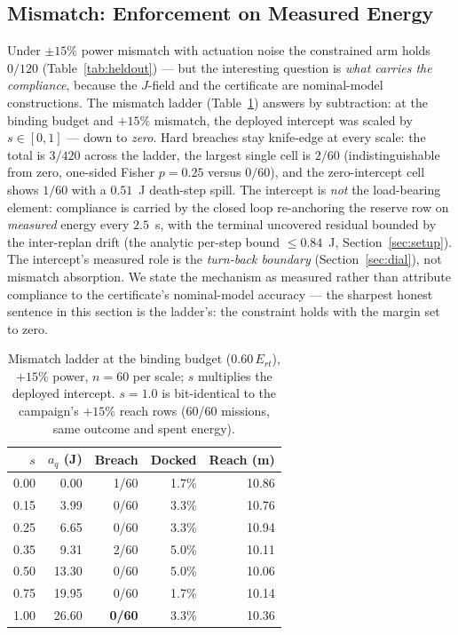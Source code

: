 \documentclass[preprint,12pt]{elsarticle}
\begin{document}
\subsection{Mismatch: Enforcement on Measured Energy}
\label{sec:mismatch}

Under $\pm 15\%$ power mismatch with actuation noise the constrained
arm holds $0/120$ (Table~\ref{tab:heldout}) --- but the interesting
question is \emph{what carries the compliance}, because the $J$-field
and the certificate are nominal-model constructions. The mismatch
ladder (Table~\ref{tab:p5}) answers by subtraction: at the binding
budget and $+15\%$ mismatch, the deployed intercept was scaled by
$s \in [0, 1]$ --- down to \emph{zero}. Hard breaches stay
knife-edge at every scale: the total is $3/420$ across the ladder,
the largest single cell is $2/60$ (indistinguishable from zero,
one-sided Fisher $p = 0.25$ versus $0/60$), and the zero-intercept
cell shows $1/60$ with a $0.51$~J death-step spill.
 The intercept is \emph{not} the load-bearing element: compliance is
carried by the closed loop re-anchoring the reserve row on
\emph{measured} energy every $2.5$~s, with the terminal uncovered
residual bounded by the inter-replan drift (the analytic per-step
bound $\le 0.84$~J,
Section~\ref{sec:setup}). The intercept's measured role is the
\emph{turn-back boundary} (Section~\ref{sec:dial}), not mismatch
absorption. We state the mechanism as measured rather than attribute
compliance to the certificate's nominal-model accuracy --- the
sharpest honest sentence in this section is the ladder's: the
constraint holds with the margin set to zero.

\begin{table}[!t]
\caption{Mismatch ladder at the binding budget ($0.60\,E_{rt}$),
$+15\%$ power, $n = 60$ per scale; $s$ multiplies the deployed
intercept. $s = 1.0$ is bit-identical to the campaign's
$+15\%$ reach rows (60/60 missions, same outcome and spent energy).}
\label{tab:p5}
\centering
\begin{tabular}{rrrrr}
\toprule
$s$ & $a_q$ (J) & Breach & Docked & Reach (m)\\
\midrule
0.00 & 0.00 & 1/60 & 1.7\% & 10.86\\
0.15 & 3.99 & 0/60 & 3.3\% & 10.76\\
0.25 & 6.65 & 0/60 & 3.3\% & 10.94\\
0.35 & 9.31 & 2/60 & 5.0\% & 10.11\\
0.50 & 13.30 & 0/60 & 5.0\% & 10.06\\
0.75 & 19.95 & 0/60 & 1.7\% & 10.14\\
1.00 & 26.60 & \textbf{0/60} & 3.3\% & 10.36\\
\bottomrule
\end{tabular}
\end{table}
\end{document}
